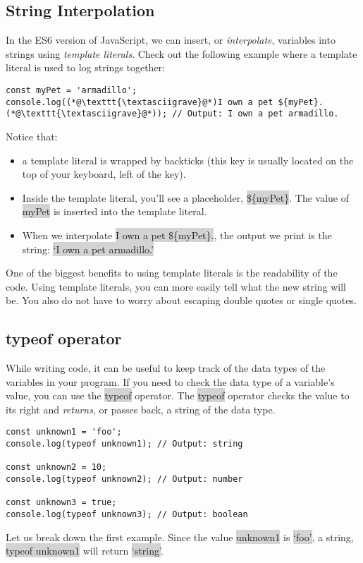 \documentclass[11pt]{article}
\begin{document}
\subsection{String Interpolation}
In the ES6 version of JavaScript, we can insert, or \textit{interpolate}, variables into strings using \textit{template literals}. Check out the following example where a template literal is used to log strings together:
\textasciigrave
\begin{lstlisting}
const myPet = 'armadillo';
console.log((*@\texttt{\textasciigrave}@*)I own a pet ${myPet}.(*@\texttt{\textasciigrave}@*)); // Output: I own a pet armadillo.
\end{lstlisting}
Notice that:
\begin{itemize}[leftmargin = *]
\item a template literal is wrapped by backticks \colorbox{lightgray}{\textasciigrave} (this key is usually located on the top of your keyboard, left of the  key).
\item Inside the template literal, you’ll see a placeholder, \colorbox{lightgray}{\$\{myPet\}}. The value of \colorbox{lightgray}{myPet} is inserted into the template literal.
\item When we interpolate \colorbox{lightgray}{\textasciigrave I own a pet \$\{myPet\}.\textasciigrave}, the output we print is the string: \colorbox{lightgray}{`I own a pet armadillo.'}
\end{itemize}
One of the biggest benefits to using template literals is the readability of the code. Using template literals, you can more easily tell what the new string will be. You also do not have to worry about escaping double quotes or single quotes. 

\subsection{typeof operator}
While writing code, it can be useful to keep track of the data types of the variables in your program. If you need to check the data type of a variable’s value, you can use the \colorbox{lightgray}{typeof} operator. The \colorbox{lightgray}{typeof} operator checks the value to its right and \textit{returns}, or passes back, a string of the data type. 
\begin{lstlisting}
const unknown1 = 'foo';
console.log(typeof unknown1); // Output: string

const unknown2 = 10;
console.log(typeof unknown2); // Output: number

const unknown3 = true; 
console.log(typeof unknown3); // Output: boolean
\end{lstlisting}
Let us break down the first example. Since the value \colorbox{lightgray}{unknown1} is \colorbox{lightgray}{`foo'}, a string, \colorbox{lightgray}{typeof unknown1} will return \colorbox{lightgray}{`string'}.
\end{document}
